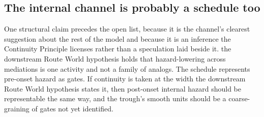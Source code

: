 \subsection{The internal channel is probably a schedule too}
\label{sch:subsub:internalschedule}

One structural claim precedes the open list, because it is
the channel's clearest suggestion about the rest of the model and because
it is an inference the Continuity Principle licenses rather than a
speculation laid beside it. the downstream Route World hypothesis holds that hazard-lowering across
mediations is one activity and not a family of analogs. The schedule
represents pre-onset hazard as gates. If continuity is taken at the width
the downstream Route World hypothesis states it, then post-onset internal
hazard should be representable the same way, and the trough's smooth
units should be a coarse-graining of gates not yet identified.

